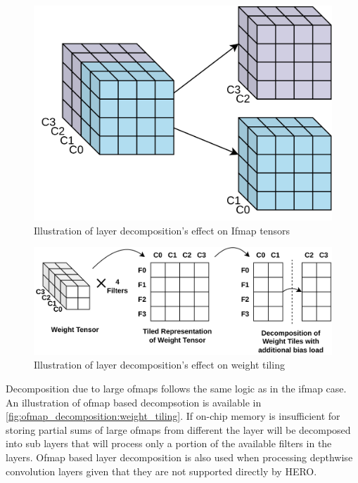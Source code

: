 \begin{figure}[ht]
    \centering
    \includegraphics[scale=0.25]{fig/ifmap_decomposition.pdf}
    \caption{Illustration of layer decomposition's effect on Ifmap tensors}
    \label{fig:ifmap_decomposition}
\end{figure}


\begin{figure}[ht]
    \centering
    \includegraphics[scale=0.4]{fig/ifmap_decomposition_tiling_repr.pdf}
    \caption{Illustration of layer decomposition's effect on weight tiling}
    \label{fig:ifmap_decomposition:weight_tiling}
\end{figure}

Decomposition due to large ofmaps follows the same logic as in the ifmap case.
An illustration of ofmap based decompsotion is available in
\autoref{fig:ofmap_decomposition:weight_tiling}. If on-chip memory is
insufficient for storing partial sums of large ofmaps from different the layer will be
decomposed into sub layers that will process only a portion of the available
filters in the layers. Ofmap based layer decomposition is also used when
processing depthwise convolution layers given that they are not supported
directly by HERO.  

